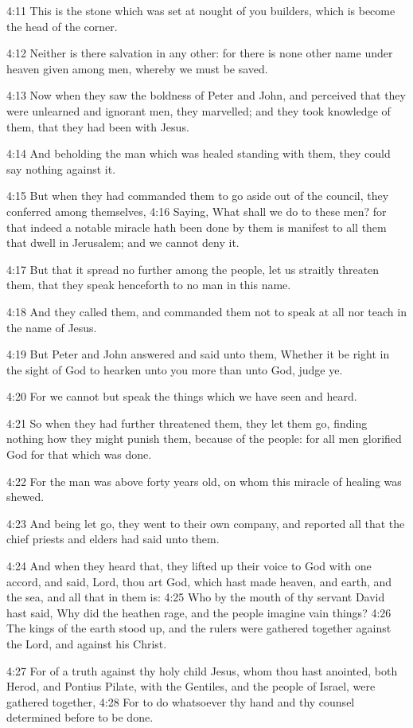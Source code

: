 4:11 This is the stone which was set at nought of you builders, which is become the head of the corner.

4:12 Neither is there salvation in any other: for there is none other name under heaven given among men, whereby we must be saved.

4:13 Now when they saw the boldness of Peter and John, and perceived that they were unlearned and ignorant men, they marvelled; and they took knowledge of them, that they had been with Jesus.

4:14 And beholding the man which was healed standing with them, they could say nothing against it.

4:15 But when they had commanded them to go aside out of the council, they conferred among themselves, 4:16 Saying, What shall we do to these men? for that indeed a notable miracle hath been done by them is manifest to all them that dwell in Jerusalem; and we cannot deny it.

4:17 But that it spread no further among the people, let us straitly threaten them, that they speak henceforth to no man in this name.

4:18 And they called them, and commanded them not to speak at all nor teach in the name of Jesus.

4:19 But Peter and John answered and said unto them, Whether it be right in the sight of God to hearken unto you more than unto God, judge ye.

4:20 For we cannot but speak the things which we have seen and heard.

4:21 So when they had further threatened them, they let them go, finding nothing how they might punish them, because of the people: for all men glorified God for that which was done.

4:22 For the man was above forty years old, on whom this miracle of healing was shewed.

4:23 And being let go, they went to their own company, and reported all that the chief priests and elders had said unto them.

4:24 And when they heard that, they lifted up their voice to God with one accord, and said, Lord, thou art God, which hast made heaven, and earth, and the sea, and all that in them is: 4:25 Who by the mouth of thy servant David hast said, Why did the heathen rage, and the people imagine vain things?  4:26 The kings of the earth stood up, and the rulers were gathered together against the Lord, and against his Christ.

4:27 For of a truth against thy holy child Jesus, whom thou hast anointed, both Herod, and Pontius Pilate, with the Gentiles, and the people of Israel, were gathered together, 4:28 For to do whatsoever thy hand and thy counsel determined before to be done.

